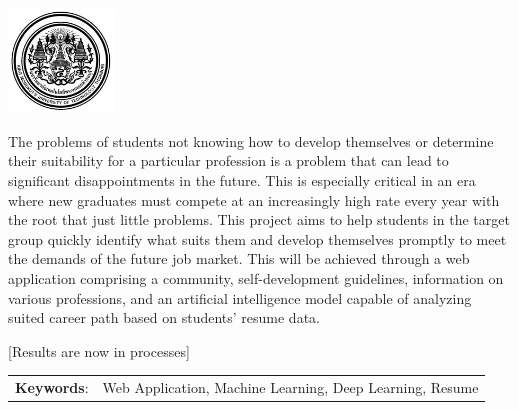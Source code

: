 \documentclass[12pt,oneside,openright,a4paper]{cpe-thai-project}
\begin{document}
\pdfstringdefDisableCommands{%
    \let\MakeUppercase\relax
}

\begin{center}
    \includegraphics[width=2.8cm]{logo02.jpg}
\end{center}
\vspace*{-1cm}

\maketitlepage
\makesignaturepage

\abstract

The problems of students not knowing how to develop themselves or determine their suitability for a particular profession 
is a problem that can lead to significant disappointments in the future. This is especially critical in an era where new graduates 
must compete at an increasingly high rate every year with the root that just little problems. This project aims to help students in 
the target group quickly identify what suits them and develop themselves promptly to meet the demands of the future job market. 
This will be achieved through a web application comprising a community, self-development guidelines, information on various professions, 
and an artificial intelligence model capable of analyzing suited career path based on students' resume data.

[Results are now in processes]

\begin{flushleft}
    \begin{tabular*}{\textwidth}{@{}lp{}}
        \textbf{Keywords}: & Web Application, Machine Learning, Deep Learning, Resume
    \end{tabular*}
\end{flushleft}
\endabstract

\thaiabstract
\end{document}
